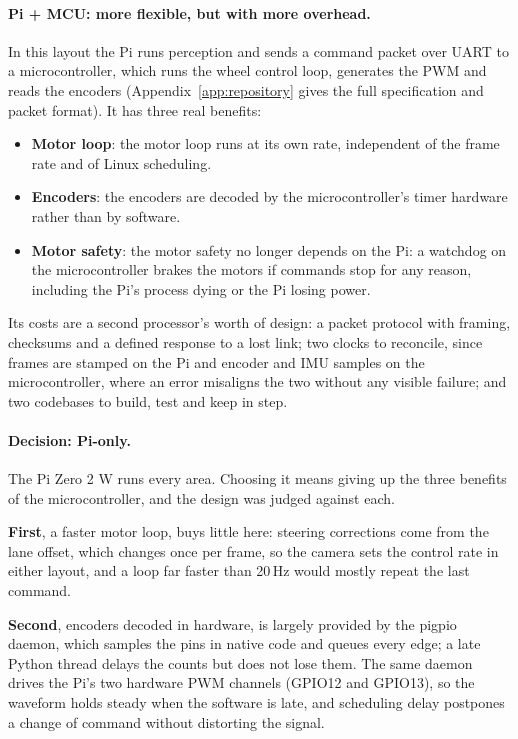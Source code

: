 \paragraph{Pi + MCU: more flexible, but with more overhead.}
In this layout the Pi runs perception and sends a command packet over UART to a
microcontroller, which runs the wheel control loop, generates the PWM and reads
the encoders (Appendix~\ref{app:repository} gives the full specification and
packet format). It has three real benefits:

\begin{itemize}
      \item \textbf{Motor loop}: the motor loop runs at its own rate, independent of the frame rate and of Linux
            scheduling.
      \item \textbf{Encoders}: the encoders are decoded by the microcontroller's timer hardware rather than by
            software.
      \item \textbf{Motor safety}: the motor safety no longer depends on the Pi: a watchdog on the microcontroller
            brakes the motors if commands stop for any reason, including the Pi's process
            dying or the Pi losing power.
\end{itemize}

Its costs are a second processor's worth of design: a packet protocol with
framing, checksums and a defined response to a lost link; two clocks to
reconcile, since frames are stamped on the Pi and encoder and IMU samples on
the microcontroller, where an error misaligns the two without any visible
failure; and two codebases to build, test and keep in step.

\paragraph{Decision: Pi-only.}
The Pi Zero 2 W runs every area. Choosing it means giving up the three benefits
of the microcontroller, and the design was judged against each.

\textbf{First}, a faster motor loop, buys little here: steering corrections come
from the lane offset, which changes once per frame, so the camera sets the
control rate in either layout, and a loop far faster than 20\,Hz would mostly
repeat the last command.

\textbf{Second}, encoders decoded in hardware, is largely
provided by the pigpio daemon, which samples the pins in native code and queues
every edge; a late Python thread delays the counts but does not lose them. The
same daemon drives the Pi's two hardware PWM channels (GPIO12 and GPIO13), so
the waveform holds steady when the software is late, and scheduling delay
postpones a change of command without distorting the signal.

